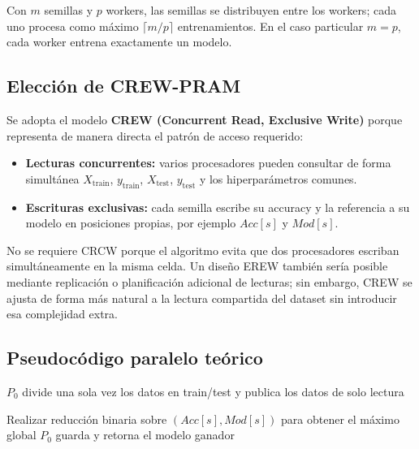 \documentclass[11pt,a4paper]{article}
\begin{document}
Con $m$ semillas y $p$ workers, las semillas se distribuyen entre los workers; cada uno
procesa como máximo $\lceil m/p\rceil$ entrenamientos. En el caso particular $m=p$,
cada worker entrena exactamente un modelo.

\subsection{Elección de CREW-PRAM}

Se adopta el modelo \textbf{CREW (Concurrent Read, Exclusive Write)} porque representa
de manera directa el patrón de acceso requerido:

\begin{itemize}[leftmargin=*]
    \item \textbf{Lecturas concurrentes:} varios procesadores pueden consultar de forma
    simultánea $X_{\mathrm{train}}$, $y_{\mathrm{train}}$, $X_{\mathrm{test}}$,
    $y_{\mathrm{test}}$ y los hiperparámetros comunes.
    \item \textbf{Escrituras exclusivas:} cada semilla escribe su accuracy y la referencia
    a su modelo en posiciones propias, por ejemplo $Acc[s]$ y $Mod[s]$.
\end{itemize}

No se requiere CRCW porque el algoritmo evita que dos procesadores escriban
simultáneamente en la misma celda. Un diseño EREW también sería posible mediante
replicación o planificación adicional de lecturas; sin embargo, CREW se ajusta de forma
más natural a la lectura compartida del dataset sin introducir esa complejidad extra.

\subsection{Pseudocódigo paralelo teórico}

\begin{algorithm}[H]
\caption{Entrenamiento paralelo CREW-PRAM de múltiples MLP}
\label{alg:crew}

$P_0$ divide una sola vez los datos en train/test y publica los datos de solo lectura\;


Realizar reducción binaria sobre $(Acc[s],Mod[s])$ para obtener el máximo global\;
$P_0$ guarda y retorna el modelo ganador\;
\end{algorithm}
\end{document}
